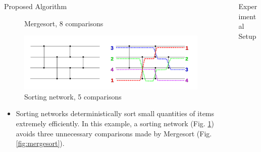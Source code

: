\documentclass[final]{beamer}
\newlength{\sepwidth}
\newlength{\colwidth}
\newcommand{\separatorcolumn}{\begin{column}{\sepwidth}\end{column}}
\begin{document}
\begin{frame}[t]
\begin{columns}[t]
\begin{column}{\colwidth}
\begin{block}{Proposed Algorithm}
\begin{figure}[h]
\begin{minipage}{0.45\textwidth}
						\centering
						\label{fig:mergesort}
						\caption{Mergesort, 8 comparisons}
					\end{minipage}\hfill
					\begin{minipage}{0.50\textwidth}
						\centering
						\includegraphics[trim={21cm 0 0 0},clip,width=\textwidth]{SimpleSortingNetworkFullOperation}
						\vspace{10mm}
						\caption{Sorting network, 5 comparisons}
						\label{fig:sortingnetwork}
					\end{minipage}\hfill
				\end{figure}

				\vspace{-8mm}
				\begin{itemize}
					\item Sorting networks deterministically sort small quantities of
								items extremely efficiently. In this example, a sorting network
								(Fig. \ref{fig:sortingnetwork}) avoids three unnecessary
								comparisons made by Mergesort (Fig. \ref{fig:mergesort}).
				\end{itemize}
			\end{block}

		\end{column}

		\separatorcolumn

		\begin{column}{\colwidth}

			\begin{block}{Experimental Setup}


\end{block}
\end{column}
\end{columns}
\end{frame}
\end{document}

